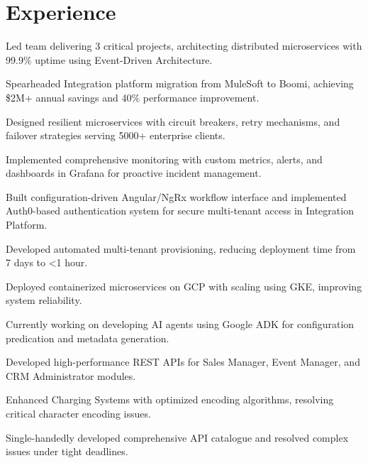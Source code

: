 \begin{minipage}[t]{0.66\textwidth}
\section{Experience}
\vspace{\topsep} %
\begin{tightemize}
\item Led team delivering 3 critical projects, architecting distributed microservices with 99.9\% uptime using Event-Driven Architecture.
\item Spearheaded Integration platform migration from MuleSoft to Boomi, achieving \$2M+ annual savings and 40\% performance improvement.
\item Designed resilient microservices with circuit breakers, retry mechanisms, and failover strategies serving 5000+ enterprise clients.
\item Implemented comprehensive monitoring with custom metrics, alerts, and dashboards in Grafana for proactive incident management.
\item Built configuration-driven Angular/NgRx workflow interface and implemented Auth0-based authentication system for secure multi-tenant access in Integration Platform.
\item Developed automated multi-tenant provisioning, reducing deployment time from 7 days to <1 hour.
\item Deployed containerized microservices on GCP with scaling using GKE, improving system reliability.
\item Currently working on developing AI agents using Google ADK for configuration predication and metadata generation.
\end{tightemize}
\sectionsep

\vspace{\topsep} %
\begin{tightemize}
\item Developed high-performance REST APIs for Sales Manager, Event Manager, and CRM Administrator modules.
\item Enhanced Charging Systems with optimized encoding algorithms, resolving critical character encoding issues.
\item Single-handedly developed comprehensive API catalogue and resolved complex issues under tight deadlines.
\end{tightemize}
\sectionsep


\end{minipage}
